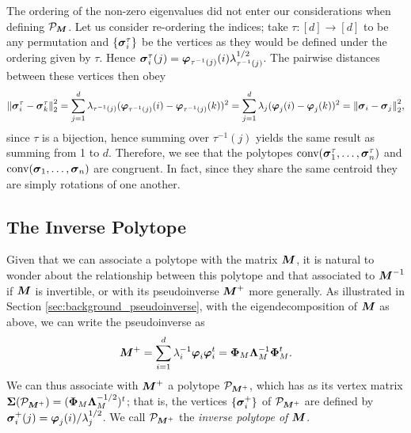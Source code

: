 \begin{remark}
	The ordering of the non-zero eigenvalues did not enter our considerations when defining $\mathcal{P}_{\vb*{M}}$. Let us consider re-ordering the indices; take $\tau:[d]\to[d]$ to be any permutation and $\{\vb*{\sigma}_i^\tau\}$ be the vertices as they would be defined under the ordering given by $\tau$. Hence $\vb*{\sigma}_i^\tau(j) = \vb*{\varphi}_{\tau^{-1}(j)}(i)\lambda_{\tau^{-1}(j)}^{1/2}$. The pairwise distances between these vertices then obey 
	\begin{equation*}
	\norm{\vb*{\sigma}_i^\tau-\vb*{\sigma}_k^\tau}_2^2 = \sum_{j=1}^d \lambda_{\tau^{-1}(j)} (\vb*{\varphi}_{\tau^{-1}(j)}(i)-\vb*{\varphi}_{\tau^{-1}(j)}(k))^2 = \sum_{j=1}^d \lambda_{j} (\vb*{\varphi}_{j}(i)-\vb*{\varphi}_{j}(k))^2 = \norm{\vb*{\sigma}_i-\vb*{\sigma}_j}_2^2,
	\end{equation*}
	since $\tau$ is a bijection, hence summing over $\tau^{-1}(j)$ yields the same result as summing from 1 to $d$. 
	Therefore, we see that the polytopes $\textnormal{conv}(\vb*{\sigma}_1^\tau,\dots,\vb*{\sigma}_n^\tau)$ and  $\textnormal{conv}(\vb*{\sigma}_1,\dots,\vb*{\sigma}_n)$ are congruent. In fact, since they share the same centroid they are simply rotations of one another. 
\end{remark}


\subsection{The Inverse Polytope} 
\label{sec:inverse_polytope}
Given that we can associate a polytope with the matrix ${\vb*{M}}$, it is natural to wonder about the relationship between this polytope and that associated to ${\vb*{M}}^{-1}$ if ${\vb*{M}}$ is invertible, or with its pseudoinverse ${\vb*{M}}^+$ more generally. As illustrated in Section \ref{sec:background_pseudoinverse}, with the eigendecomposition of ${\vb*{M}}$ as above, we can write  the pseudoinverse as 
\[{\vb*{M}}^+=\sum_{i=1}^d \lambda_i^{-1} \vb*{\varphi}_i\vb*{\varphi}_i^t = \boldsymbol{\Phi}_M \vb{\Lambda}_M^{-1}\boldsymbol{\Phi}^t_M.\]
We can thus associate with ${\vb*{M}}^+$ a polytope $\mathcal{P}_{{\vb*{M}}^+}$, which has as its vertex matrix $\boldsymbol{\Sigma}(\mathcal{P}_{{\vb*{M}}^+})=(\boldsymbol{\Phi}_M\vb{\Lambda}_M^{-1/2})^t$; that is, the vertices $\{\vb*{\sigma}_i^+\}$ of $\mathcal{P}_{{\vb*{M}}^+}$ are defined by 
$\vb*{\sigma}_i^+(j)=\vb*{\varphi}_j(i)/\lambda_j^{1/2}$. We call $\mathcal{P}_{{\vb*{M}}^+}$ the \emph{inverse polytope of ${\vb*{M}}$}. 

